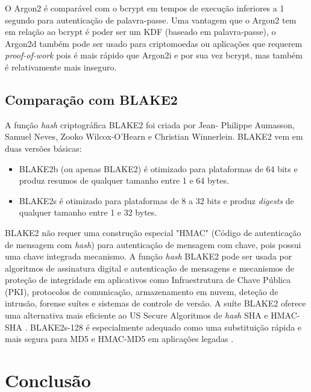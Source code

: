 \documentclass[conference]{IEEEtran}
\begin{document}
O Argon2 é comparável com o bcrypt em tempos de execução inferiores a 1 segundo para autenticação 
de palavra-passe. Uma vantagem que o Argon2 tem em relação ao bcrypt é poder ser um KDF (baseado em palavra-passe), 
o Argon2d também pode ser usado para criptomoedas ou aplicações que requerem \textit{proof-of-work} pois 
é mais rápido que Argon2i e por sua vez bcrypt, mas também é relativamente mais inseguro.

\subsection{Comparação com BLAKE2}

A função \textit{hash} criptográfica BLAKE2 foi criada por Jean-
Philippe Aumasson, Samuel Neves, Zooko Wilcox-O'Hearn e Christian
Winnerlein. BLAKE2 vem em duas versões básicas:

\begin{itemize}
\item BLAKE2b (ou apenas BLAKE2) é otimizado para plataformas de 64 bits e
produz resumos de qualquer tamanho entre 1 e 64 bytes.
\item BLAKE2s é otimizado para plataformas de 8 a 32 bits e produz
\textit{digests} de qualquer tamanho entre 1 e 32 bytes.
\end{itemize}

BLAKE2 não requer uma construção especial "HMAC" (Código de autenticação de mensagem com \textit{hash})
para autenticação de mensagem com chave, pois possui uma chave integrada
mecanismo. A função \textit{hash} BLAKE2 pode ser usada por algoritmos de assinatura digital
e autenticação de mensagens e mecanismos de proteção de integridade em
aplicativos como Infraestrutura de Chave Pública (PKI),
protocolos de comunicação, armazenamento em nuvem, deteção de intrusão, forense
suítes e sistemas de controle de versão. A suíte BLAKE2 oferece uma alternativa mais eficiente ao US Secure
Algoritmos de \textit{hash} SHA e HMAC-SHA \cite{rfc6234}. BLAKE2s-128 é
especialmente adequado como uma substituição rápida e mais segura para
MD5 e HMAC-MD5 em aplicações legadas \cite{rfc6151}. \cite{rfc7693}

\section{Conclusão}
\end{document}
